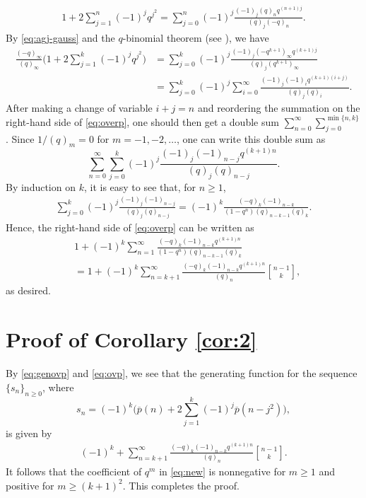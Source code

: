 \documentclass[12pt]{article}
\theoremstyle{remark}
\numberwithin{equation}{section}
\begin{document}
\begin{align}
1+2\sum_{j=1}^n (-1)^j q^{j^2}
=\sum_{j=0}^n (-1)^j \frac{(-1)_{j} (q)_n q^{(n+1)j}}{(q)_j (-q)_{n}}. \label{eq:agj-gauss}
\end{align}
By \eqref{eq:agj-gauss} and the $q$-binomial theorem (see \cite[Theorem 2.1]{Andrews98}), we have
\begin{align}
\frac{(-q)_\infty}{(q)_\infty}\bigg(1+2\sum_{j=1}^k (-1)^j q^{j^2}\bigg)
&=\sum_{j=0}^k (-1)^j \frac{(-1)_{j} (-q^{k+1})_\infty q^{(k+1)j}}{(q)_j (q^{k+1})_{\infty}} \nonumber\\
&=\sum_{j=0}^k (-1)^j \sum_{i=0}^{\infty}\frac{(-1)_{j} (-1)_i q^{(k+1)(i+j)}}{(q)_j (q)_i}.
\label{eq:overp}
\end{align}
After making a change of variable $i+j=n$ and reordering
the summation on the right-hand side of \eqref{eq:overp}, one  should then get  a double sum
$\sum_{n=0}^\infty \sum_{j=0}^{\min\{n,k\}}$. Since $1/(q)_m=0$ for $m=-1,-2,\dots$, one can write
this double sum as
\[
\sum_{n=0}^\infty \sum_{j=0}^k (-1)^j \frac{(-1)_{j} (-1)_{n-j} q^{(k+1)n}}{(q)_j (q)_{n-j}}.
\]
By induction on $k$, it is easy to see that, for $n\geqslant 1$,
\begin{align*}
\sum_{j=0}^k (-1)^j \frac{(-1)_{j} (-1)_{n-j}}{(q)_j (q)_{n-j}} =(-1)^k \frac{(-q)_{k} (-1)_{n-k}}{(1-q^n)(q)_{n-k-1} (q)_{k}}.
\end{align*}
Hence,  the right-hand side of \eqref{eq:overp} can be written as
\begin{align*}
&1+(-1)^k \sum_{n=1}^\infty \frac{(-q)_{k} (-1)_{n-k}q^{(k+1)n}}{(1-q^n)(q)_{n-k-1} (q)_{k}}\\
&=1+(-1)^k \sum_{n=k+1}^\infty \frac{(-q)_{k} (-1)_{n-k}q^{(k+1)n}}{(q)_n}{n-1\brack k},
\end{align*}
as desired.

\section{Proof of Corollary \ref{cor:2}}
By \eqref{eq:genovp} and \eqref{eq:ovp}, we see that the generating function for the sequence
$\{s_n\}_{n\geqslant 0}$, where
$$
s_n=(-1)^k \bigg(\overline{p}(n)+2\sum_{j=1}^k (-1)^{j}\overline{p}(n-j^2) \bigg),
$$
is given by
\begin{align}\label{eq:new}
(-1)^k+\sum_{n=k+1}^\infty \frac{(-q)_{k} (-1)_{n-k}q^{(k+1)n}}{(q)_n}{n-1\brack k}.
\end{align}
It follows that the  coefficient of $q^m$ in \eqref{eq:new} is  nonnegative for $m\geqslant 1$ and  positive
 for $m\geqslant (k+1)^2$. This completes the proof.
\end{document}
